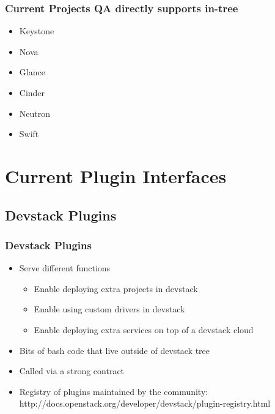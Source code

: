 \documentclass[aspectratio=169,11pt,hyperref={colorlinks=true}]{beamer}
\begin{document}
\begin{frame}
    \frametitle{Current Projects QA directly supports in-tree}
    \begin{itemize}
        \item Keystone
        \item Nova
        \item Glance
        \item Cinder
        \item Neutron
        \item Swift
    \end{itemize}
\end{frame}

\section{Current Plugin Interfaces}
\subsection{Devstack Plugins}
\begin{frame}
	\frametitle{Devstack Plugins}

    \begin{itemize}
        \item{Serve different functions}
        \begin{itemize}
            \item{Enable deploying extra projects in devstack}
            \item{Enable using custom drivers in devstack}
            \item{Enable deploying extra services on top of a devstack cloud}
        \end{itemize}
    \end{itemize}

    \begin{itemize}
        \item Bits of bash code that live outside of devstack tree
        \item Called via a strong contract
        \item Registry of plugins maintained by the community: \hfill
        \\ http://docs.openstack.org/developer/devstack/plugin-registry.html
    \end{itemize}
\end{frame}
\end{document}
